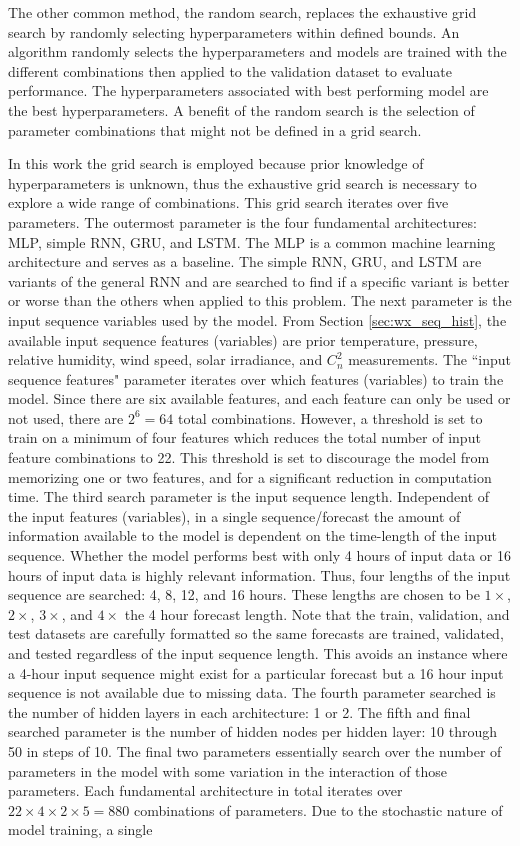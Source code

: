 The other common method, the random search, replaces the exhaustive grid search by randomly selecting hyperparameters within defined bounds. An algorithm randomly selects the hyperparameters and models are trained with the different combinations then applied to the validation dataset to evaluate performance. The hyperparameters associated with best performing model are the best hyperparameters. A benefit of the random search is the selection of parameter combinations that might not be defined in a grid search.

In this work the grid search is employed because prior knowledge of hyperparameters is unknown, thus the exhaustive grid search is necessary to explore a wide range of combinations. This grid search iterates over five parameters. The outermost parameter is the four fundamental architectures: MLP, simple RNN, GRU, and LSTM. The MLP is a common machine learning architecture and serves as a baseline. The simple RNN, GRU, and LSTM are variants of the general RNN and are searched to find if a specific variant is better or worse than the others when applied to this problem. The next parameter is the input sequence variables used by the model. From Section \ref{sec:wx_seq_hist}, the available input sequence features (variables) are prior temperature, pressure, relative humidity, wind speed, solar irradiance, and $C_{n}^{2}$ measurements. The ``input sequence features" parameter iterates over which features (variables) to train the model. Since there are six available features, and each feature can only be used or not used, there are $2^6 = 64$ total combinations. However, a threshold is set to train on a minimum of four features which reduces the total number of input feature combinations to 22. This threshold is set to discourage the model from memorizing one or two features, and for a significant reduction in computation time. The third search parameter is the input sequence length. Independent of the input features (variables), in a single sequence/forecast the amount of information available to the model is dependent on the time-length of the input sequence. Whether the model performs best with only 4 hours of input data or 16 hours of input data is highly relevant information. Thus, four lengths of the input sequence are searched: 4, 8, 12, and 16 hours. These lengths are chosen to be $1\times$, $2\times$, $3\times$, and $4\times$ the 4 hour forecast length. Note that the train, validation, and test datasets are carefully formatted so the same forecasts are trained, validated, and tested regardless of the input sequence length. This avoids an instance where a 4-hour input sequence might exist for a particular forecast but a 16 hour input sequence is not available due to missing data. The fourth parameter searched is the number of hidden layers in each architecture: 1 or 2. The fifth and final searched parameter is the number of hidden nodes per hidden layer: 10 through 50 in steps of 10. The final two parameters essentially search over the number of parameters in the model with some variation in the interaction of those parameters. Each fundamental architecture in total iterates over $22 \times 4 \times 2 \times 5 = 880$ combinations of parameters. Due to the stochastic nature of model training, a single 